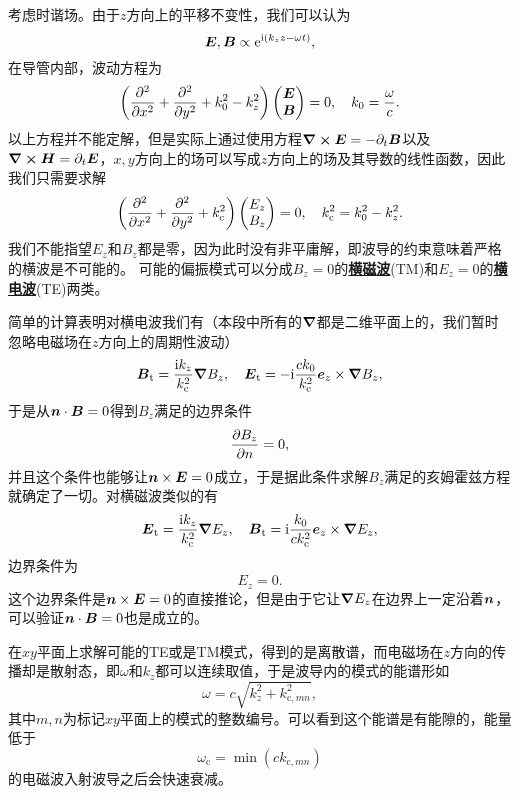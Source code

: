 \documentclass[UTF8, a4paper]{ctexart}
\newcommand*{\ee}{\mathrm{e}}
\newcommand*{\ii}{\mathrm{i}}
\newcommand*{\concept}[1]{\underline{\textbf{#1}}}
\begin{document}
考虑时谐场。由于$z$方向上的平移不变性，我们可以认为
\[
    \vb*{E}, \vb*{B} \propto \ee^{\ii (k_z z - \omega t)},
\]
在导管内部，波动方程为
\begin{equation}
    \left( \pdv[2]{x} + \pdv[2]{y} + k_0^2 - k_z^2 \right) \pmqty{\vb*{E} \\ \vb*{B}} = 0, \quad k_0 = \frac{\omega}{c}.
\end{equation}
以上方程并不能定解，但是实际上通过使用方程$\curl{\vb*{E}}=-\partial_t \vb*{B}$以及$\curl{\vb*{H}} = \partial_t \vb*{E}$，$x, y$方向上的场可以写成$z$方向上的场及其导数的线性函数，因此我们只需要求解
\begin{equation}
    \left( \pdv[2]{x} + \pdv[2]{y} + k_\text{c}^2 \right) \pmqty{E_z \\ B_z} = 0, \quad k_\text{c}^2 = k_0^2 - k_z^2.
\end{equation}
我们不能指望$E_z$和$B_z$都是零，因为此时没有非平庸解，即波导的约束意味着严格的横波是不可能的。
可能的偏振模式可以分成$B_z=0$的\concept{横磁波}(TM)和$E_z=0$的\concept{横电波}(TE)两类。

简单的计算表明对横电波我们有（本段中所有的$\grad$都是二维平面上的，我们暂时忽略电磁场在$z$方向上的周期性波动）
\begin{equation}
    \vb*{B}_\text{t} = \frac{\ii k_z}{k_\text{c}^2} \grad{B_z}, \quad \vb*{E}_\text{t} = - \ii \frac{c k_0}{k_\text{c}^2} \vb*{e}_z \times \grad{B_z},
\end{equation}
于是从$\vb*{n} \cdot \vb*{B} = 0$得到$B_z$满足的边界条件
\begin{equation}
    \pdv{B_z}{n} = 0,
\end{equation}
并且这个条件也能够让$\vb*{n} \times \vb*{E} = 0$成立，于是据此条件求解$B_z$满足的亥姆霍兹方程就确定了一切。对横磁波类似的有
\begin{equation}
    \vb*{E}_\text{t} = \frac{\ii k_z}{k_\text{c}^2} \grad{E_z}, \quad \vb*{B}_\text{t} = \ii \frac{k_0}{ck_\text{c}^2} \vb*{e}_z \times \grad{E_z},
\end{equation}
边界条件为
\begin{equation}
    E_z = 0.
\end{equation}
这个边界条件是$\vb*{n} \times \vb*{E}=0$的直接推论，但是由于它让$\grad{E_z}$在边界上一定沿着$\vb*{n}$，可以验证$\vb*{n} \cdot \vb*{B}=0$也是成立的。

在$xy$平面上求解可能的TE或是TM模式，得到的是离散谱，而电磁场在$z$方向的传播却是散射态，即$\omega$和$k_z$都可以连续取值，于是波导内的模式的能谱形如
\begin{equation}
    \omega = c \sqrt{k_z^2 + k_{\text{c}, mn}^2},
\end{equation}
其中$m, n$为标记$xy$平面上的模式的整数编号。可以看到这个能谱是有能隙的，能量低于
\begin{equation}
    \omega_\text{c} = \min (c k_{\text{c}, mn})
\end{equation}
的电磁波入射波导之后会快速衰减。
\end{document}
